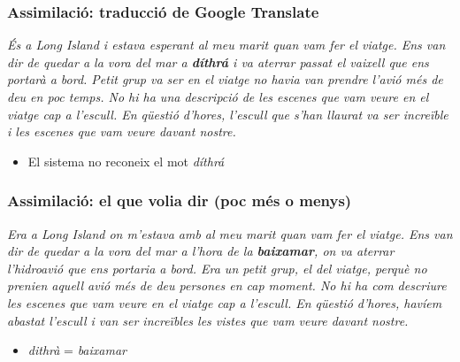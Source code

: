 \documentclass{beamer}
\newcommand{\empha}[1]{\emph{#1}\/}
\begin{document}
\begin{frame}
  \frametitle{Assimilació: traducció de Google Translate}

  \empha{És a Long Island i estava esperant al meu marit quan vam fer el
  viatge. Ens van dir de quedar a la vora del mar a \textbf{díthrá} i va
  aterrar passat el vaixell que ens portarà a bord. Petit grup va ser
  en el viatge no havia van prendre l'avió més de deu en poc temps. No
  hi ha una descripció de les escenes que vam veure en el viatge cap a
  l'escull. En qüestió d'hores, l'escull que s'han llaurat va ser
  increïble i les escenes que vam veure davant nostre.}
\begin{itemize}
\item El sistema no reconeix el mot \empha{díthrá}
\end{itemize}

\end{frame}
\begin{frame}
  \frametitle{Assimilació: el que volia dir (poc més o menys)}

\empha{Era a Long Island on m'estava amb al meu marit quan vam fer el
  viatge. Ens van dir de quedar a la vora del mar a l'hora de la
  \textbf{baixamar}, on va aterrar l'hidroavió que ens portaria a bord. Era un
  petit grup, el del viatge, perquè no prenien aquell avió més de deu
  persones en cap moment. No hi ha com descriure les escenes que vam
  veure en el viatge cap a l'escull. En qüestió d'hores, havíem
  abastat l'escull i van ser increïbles les vistes que vam veure
  davant nostre.}

\begin{itemize}
\item \empha{dithrà} = \empha{baixamar}
\end{itemize}

\end{frame}


\end{document}

